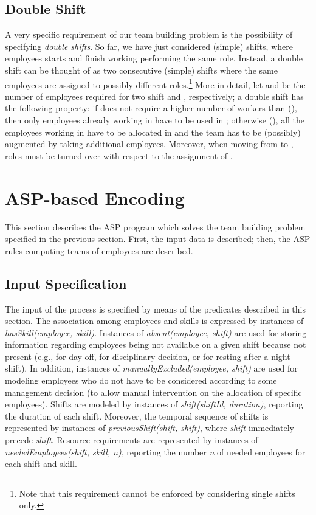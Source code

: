 \documentclass{tlp}
\begin{document}
\subsection{Double Shift}
A very specific requirement of our team building problem is the possibility of specifying {\em double shifts}.
So far, we have just considered (simple) shifts, where employees starts and
finish working performing the same role.
Instead, a double shift can be thought of as two consecutive (simple) shifts 
where the same employees are assigned to possibly different roles.\footnote{Note that this requirement cannot be enforced by considering single shifts only.}
More in detail, let  and  be the number of employees required
for two shift  and , respectively; a double shift has the following
property: if  does not require a higher number of workers than  (\iec{}),
then only employees already working in  have to be used in ;
otherwise (),  all the employees working in 
have to be allocated in  and the team has to be (possibly)  augmented
by taking additional employees.
Moreover, when moving from  to , roles must be turned over
with respect to the assignment of .


\section{ASP-based Encoding}\label{sec:encoding}

This section describes the ASP program which solves
the team building problem specified in the previous section.
First, the input data is described; then, the ASP rules computing
teams of employees are described.

\subsection{Input Specification}
The input of the process is specified by means of the predicates described in this section.
The association among employees and skills is expressed by instances of \textit{hasSkill(employee, skill)}.
Instances of \textit{absent(employee, shift)} are used for storing information regarding
employees being not available on a given shift because
not present (e.g., for day off, for disciplinary decision, or for resting after a night-shift).
In addition, instances of \textit{manuallyExcluded(employee, shift)}
are used for modeling employees who do not have to be considered according
to some management decision
(to allow manual intervention on the allocation of specific employees).
Shifts are modeled by instances of \textit{shift(shiftId, duration)}, reporting the duration of each shift.
Moreover, the temporal sequence of shifts is represented by instances of \textit{previousShift(shift, shift)}, where \textit{shift} immediately precede \textit{shift}.
Resource requirements are represented
by instances of \textit{neededEmployees(shift, skill, n)},
reporting the number \textit{n} of needed employees for each shift and skill.
\end{document}
